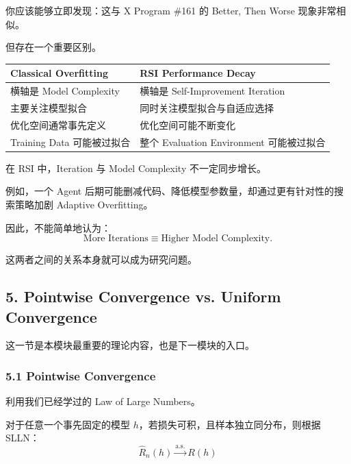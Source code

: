 你应该能够立即发现：这与 X Program \#161 的 Better, Then Worse 现象非常相似。

但存在一个重要区别。

\begin{readertable}
\begin{longtable}[]{@{}
  >{\raggedright\arraybackslash}p{}
  >{\raggedright\arraybackslash}p{}@{}}
\toprule
Classical Overfitting & RSI Performance Decay \\
\midrule
\endhead
横轴是 Model Complexity & 横轴是 Self-Improvement Iteration \\
主要关注模型拟合 & 同时关注模型拟合与自适应选择 \\
优化空间通常事先定义 & 优化空间可能不断变化 \\
Training Data 可能被过拟合 & 整个 Evaluation Environment 可能被过拟合 \\
\bottomrule
\end{longtable}
\end{readertable}

在 RSI 中，Iteration 与 Model Complexity 不一定同步增长。

例如，一个 Agent 后期可能删减代码、降低模型参数量，却通过更有针对性的搜索策略加剧 Adaptive Overfitting。

因此，不能简单地认为：
\[\text{More Iterations}
\equiv
\text{Higher Model Complexity}.\]

这两者之间的关系本身就可以成为研究问题。

\hypertarget{part-2-12-0001-pointwise-convergence-vs.-uniform-convergence}{%
\subsection{5. Pointwise Convergence vs. Uniform Convergence}\label{part-2-12-0001-pointwise-convergence-vs.-uniform-convergence}}

这一节是本模块最重要的理论内容，也是下一模块的入口。

\hypertarget{part-2-12-0001-pointwise-convergence}{%
\subsubsection{5.1 Pointwise Convergence}\label{part-2-12-0001-pointwise-convergence}}

利用我们已经学过的 Law of Large Numbers。

对于任意一个事先固定的模型 \(h\)，若损失可积，且样本独立同分布，则根据 SLLN：
\[\boxed{
\widehat R_n(h)
\xrightarrow{\mathrm{a.s.}}
R(h)
}\]


